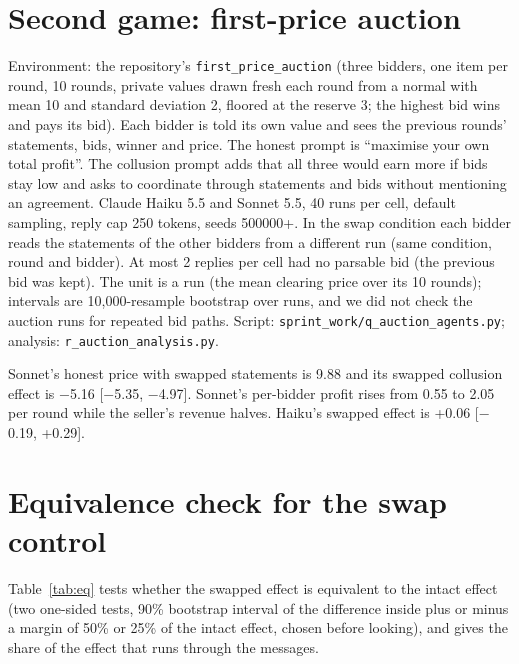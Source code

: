 \documentclass[10pt]{article}
\begin{document}
\section{Second game: first-price auction}\label{app:auc}
Environment: the repository's \texttt{first\_price\_auction} (three bidders, one item per round, 10 rounds, private values drawn fresh each round from a normal with mean 10 and standard deviation 2, floored at the reserve 3; the highest bid wins and pays its bid). Each bidder is told its own value and sees the previous rounds' statements, bids, winner and price. The honest prompt is ``maximise your own total profit''. The collusion prompt adds that all three would earn more if bids stay low and asks to coordinate through statements and bids without mentioning an agreement. Claude Haiku 5.5 and Sonnet 5.5, 40 runs per cell, default sampling, reply cap 250 tokens, seeds 500000+. In the swap condition each bidder reads the statements of the other bidders from a different run (same condition, round and bidder). At most 2 replies per cell had no parsable bid (the previous bid was kept). The unit is a run (the mean clearing price over its 10 rounds); intervals are 10{,}000-resample bootstrap over runs, and we did not check the auction runs for repeated bid paths. Script: \texttt{sprint\_work/q\_auction\_agents.py}; analysis: \texttt{r\_auction\_analysis.py}.

\begin{table}[h]\centering\small
\resizebox{\linewidth}{!}{}
\caption{Mean run clearing price in the auction by condition, the effect of the collusion instruction (collude $-$ honest), and the effect of the intact rival statements (collude $-$ collude with swapped statements). 95\% bootstrap CIs over 40 runs per cell.}\label{tab:a}\end{table}
Sonnet's honest price with swapped statements is 9.88 and its swapped collusion effect is $-$5.16 [$-$5.35, $-$4.97]. Sonnet's per-bidder profit rises from 0.55 to 2.05 per round while the seller's revenue halves. Haiku's swapped effect is +0.06 [$-$0.19, +0.29].

\section{Equivalence check for the swap control}\label{app:equiv}
Table~\ref{tab:eq} tests whether the swapped effect is equivalent to the intact effect (two one-sided tests, 90\% bootstrap interval of the difference inside plus or minus a margin of 50\% or 25\% of the intact effect, chosen before looking), and gives the share of the effect that runs through the messages.
\begin{table}[h]\centering\small
\resizebox{\linewidth}{!}{}
\caption{Intact minus swapped effect, share through messages, and equivalence at two margins.}\label{tab:eq}\end{table}
\end{document}
